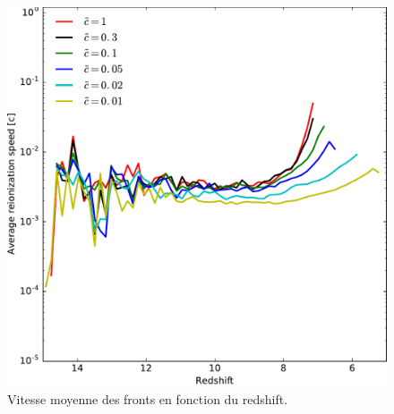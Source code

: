 \begin{figure}
        \includegraphics[width=.95\linewidth]{img/04_mapreio/avg_reionization_speed.pdf} 
        \caption[Évolution de la vitesse des fronts]{Vitesse moyenne des fronts en fonction du redshift.
        }
 		\label{fig:vreioz}
\end{figure}



